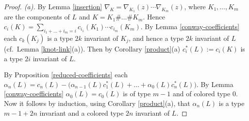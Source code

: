 \documentclass[a4paper,12pt,reqno,oneside]{amsart} %
\theoremstyle{plain}
\theoremstyle{definition}
\theoremstyle{named}
\renewcommand{\:}{\colon}
\begin{document}
\begin{proof}[Proof. (a)] By Lemma \ref{insertion} $\nabla_K=\nabla_{K_1}(z)\cdots\nabla_{K_m}(z)$, where $K_1,\dots,K_m$ 
are the components of $L$ and $K=K_1\#\dots\#K_m$.
Hence $c_i(K)=\sum_{i_1+\dots+i_m=i}c_{i_1}(K_1)\cdots c_{i_m}(K_m)$.
By Lemma \ref{conway-coefficients} each $c_k(K_j)$ is a type $2k$ invariant of $K_j$, and hence 
a type $2k$ invariant of $L$ (cf.\ Lemma \ref{knot-link}(a)).
Then by Corollary \ref{product}(a) $c^*_i(L):=c_i(K)$ is a type $2i$ invariant of $L$.

By Proposition \ref{reduced-coefficients} each 
$\alpha_n(L)=c_n(L)-\big(\alpha_{n-1}(L)c^*_1(L)+\dots+\alpha_0(L)c^*_n(L)\big)$.
By Lemma \ref{conway-coefficients} $\alpha_0(L)=c_0(L)$ is of type $m-1$ and of colored type $0$.
Now it follows by induction, using Corollary \ref{product}(a), that $\alpha_n(L)$ is a type $m-1+2n$ invariant 
and a colored type $2n$ invariant of $L$.
\end{proof}
\end{document}
